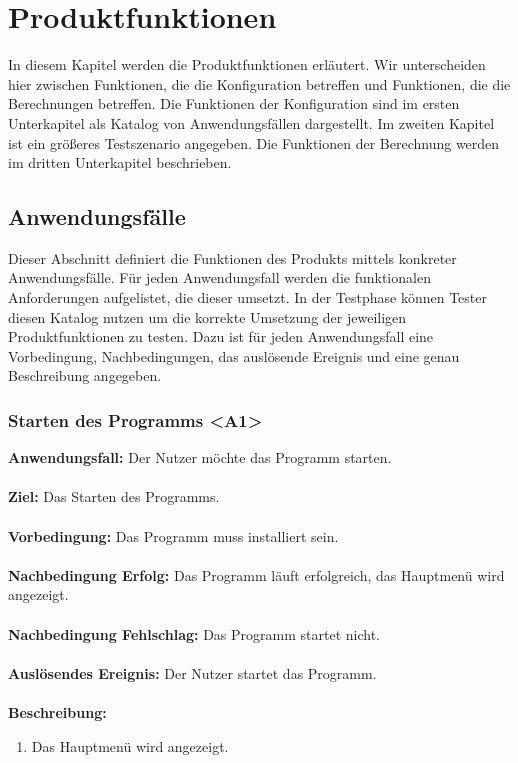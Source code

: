 \documentclass[parskip=full]{scrartcl} %
\begin{document}
\section{Produktfunktionen}
In diesem Kapitel werden die Produktfunktionen erläutert. Wir unterscheiden hier zwischen Funktionen, die die Konfiguration betreffen und Funktionen, die die Berechnungen betreffen. Die Funktionen der Konfiguration sind im ersten Unterkapitel als Katalog von Anwendungsfällen dargestellt. Im zweiten Kapitel ist ein größeres Testszenario angegeben. Die Funktionen der Berechnung werden im dritten Unterkapitel beschrieben.

\subsection{Anwendungsfälle}
Dieser Abschnitt definiert die Funktionen des Produkts mittels konkreter Anwendungsfälle. Für jeden Anwendungsfall werden die funktionalen Anforderungen aufgelistet, die dieser umsetzt. In der Testphase können Tester diesen Katalog nutzen um die korrekte Umsetzung der jeweiligen Produktfunktionen zu testen. Dazu ist für jeden Anwendungsfall eine Vorbedingung, Nachbedingungen, das auslösende Ereignis und eine genau Beschreibung angegeben.
\newpage


\subsubsection*{Starten des Programms <A1>}
\textbf{Anwendungsfall:}  Der Nutzer möchte das Programm starten.\\\\
\textbf{Ziel:} Das Starten des Programms. \\\\
\textbf{Vorbedingung:} Das Programm muss installiert sein.  \\\\
\textbf{Nachbedingung Erfolg:} Das Programm läuft erfolgreich, das Hauptmenü wird angezeigt.\\\\
\textbf{Nachbedingung Fehlschlag:} Das Programm startet nicht. \\\\
\textbf{Auslösendes Ereignis:} Der Nutzer startet das Programm. \\\\
\textbf{Beschreibung:}
\begin{enumerate}
    \item Das Hauptmenü wird angezeigt.
\end{enumerate}
\newpage
\end{document}
